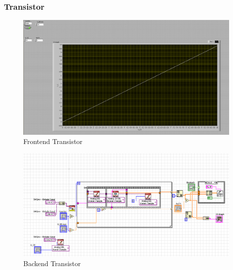 \documentclass[12pt,twoside,a4paper]{scrartcl}
\begin{document}
		\subsubsection{Transistor}
			\label{Programme::Transistor}
			\begin{figure}[H]
				\centering
				\includegraphics[width =  \textwidth]{Pictures/Programme/Frontend_Transistor}
				\caption{Frontend Transistor}
			\end{figure}

			\begin{figure}[H]
				\centering
				\includegraphics[width =  \textwidth]{Pictures/Programme/Backend_Transistor}
				\caption{Backend Transistor}
			\end{figure}
\end{document}
